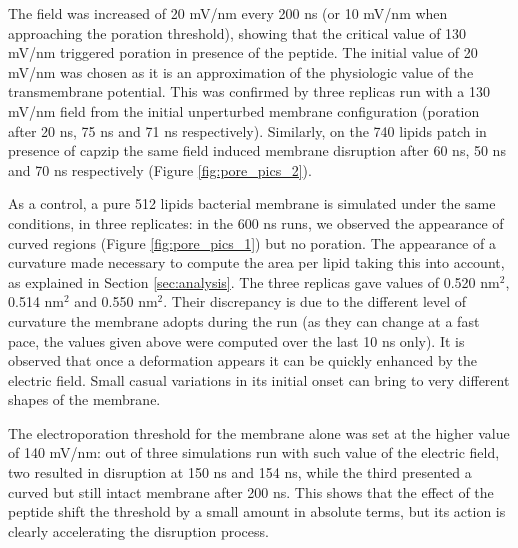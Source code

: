 The field was increased of 20 mV/nm every 200 ns (or 10 mV/nm when approaching the poration threshold), showing that the critical value of 130 mV/nm triggered poration in presence of the peptide. The initial value of 20 mV/nm was chosen as it is an approximation of the physiologic value of the transmembrane potential.
%
This was confirmed by three replicas run with a 130 mV/nm field from the initial unperturbed membrane configuration (poration after 20 ns, 75 ns and 71 ns respectively).
%
Similarly, on the 740 lipids patch in presence of capzip the same field induced membrane disruption after 60 ns, 50 ns and 70 ns respectively (Figure \ref{fig:pore_pics_2}).

As a control, a pure 512 lipids bacterial membrane is simulated under the same conditions, in three replicates: in the 600 ns runs, we observed the appearance of curved regions (Figure \ref{fig:pore_pics_1}) but no poration.
%
The appearance of a curvature made necessary to compute the area per lipid taking this into account, as explained in Section \ref{sec:analysis}. The three replicas gave values of 0.520 nm$^2$, 0.514 nm$^2$ and 0.550 nm$^2$. Their discrepancy is due to the different level of curvature the membrane adopts during the run (as they can change at a fast pace, the values given above were computed over the last 10 ns only).
%
It is observed that once a deformation appears it can be quickly enhanced by the electric field. Small casual variations in its initial onset can bring to very different shapes of the membrane.

The electroporation threshold for the membrane alone was set at the higher value of 140 mV/nm: out of three simulations run with such value of the electric field, two resulted in disruption at 150 ns and 154 ns, while the third presented a curved but still intact membrane after 200 ns.
%
This shows that the effect of the peptide shift the threshold by a small amount in absolute terms, but its action is clearly accelerating the disruption process.

